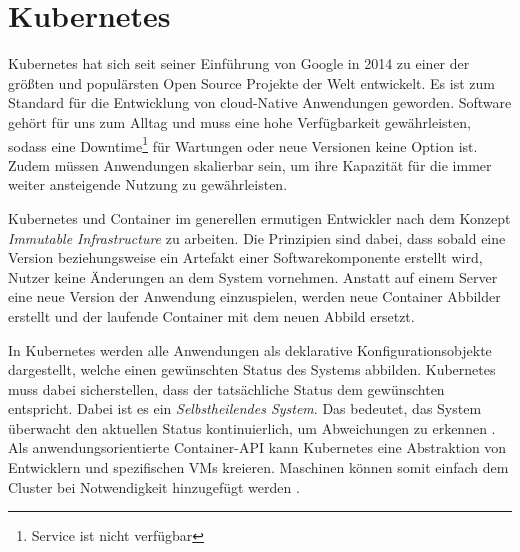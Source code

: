 \section{Kubernetes}
\label{sec:grundlagen:kubernetes}
Kubernetes hat sich seit seiner Einführung von Google in 2014 zu einer der größten und populärsten 
Open Source Projekte der Welt entwickelt. Es ist zum Standard für die Entwicklung von cloud-Native 
Anwendungen geworden. 
Software gehört für uns zum Alltag und muss eine hohe Verfügbarkeit gewährleisten, sodass eine Downtime\footnote{Service ist nicht verfügbar}
für Wartungen oder neue Versionen keine Option ist. 
Zudem müssen Anwendungen skalierbar sein, um ihre Kapazität für die immer weiter ansteigende Nutzung zu gewährleisten.

Kubernetes und Container im generellen ermutigen Entwickler nach dem Konzept \emph{Immutable Infrastructure} zu arbeiten.
Die Prinzipien sind dabei, dass sobald eine Version beziehungsweise ein Artefakt einer Softwarekomponente erstellt wird,
Nutzer keine Änderungen an dem System vornehmen. 
Anstatt auf einem Server eine neue Version der Anwendung einzuspielen, werden neue Container Abbilder erstellt 
und der laufende Container mit dem neuen Abbild ersetzt.

In Kubernetes werden alle Anwendungen als deklarative Konfigurationsobjekte dargestellt, welche einen gewünschten
Status des Systems abbilden. Kubernetes muss dabei sicherstellen, dass der tatsächliche Status dem gewünschten entspricht.
Dabei ist es ein \emph{Selbstheilendes System}.
Das bedeutet, das System überwacht den aktuellen Status kontinuierlich, um Abweichungen zu erkennen \cite{Burns2019}.
Als anwendungsorientierte Container-API kann Kubernetes eine Abstraktion von Entwicklern und spezifischen \acp{VM} kreieren.
Maschinen können somit einfach dem Cluster bei Notwendigkeit hinzugefügt werden \cite{Burns2019}.